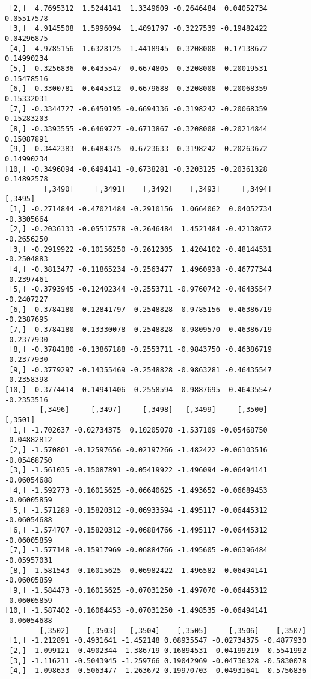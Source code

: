 \documentclass[
  letterpaper,
  DIV=11,
  numbers=noendperiod]{scrreprt}
\begin{document}
\begin{verbatim}
 [2,]  4.7695312  1.5244141  1.3349609 -0.2646484  0.04052734 0.05517578
 [3,]  4.9145508  1.5996094  1.4091797 -0.3227539 -0.19482422 0.04296875
 [4,]  4.9785156  1.6328125  1.4418945 -0.3208008 -0.17138672 0.14990234
 [5,] -0.3256836 -0.6435547 -0.6674805 -0.3208008 -0.20019531 0.15478516
 [6,] -0.3300781 -0.6445312 -0.6679688 -0.3208008 -0.20068359 0.15332031
 [7,] -0.3344727 -0.6450195 -0.6694336 -0.3198242 -0.20068359 0.15283203
 [8,] -0.3393555 -0.6469727 -0.6713867 -0.3208008 -0.20214844 0.15087891
 [9,] -0.3442383 -0.6484375 -0.6723633 -0.3198242 -0.20263672 0.14990234
[10,] -0.3496094 -0.6494141 -0.6738281 -0.3203125 -0.20361328 0.14892578
         [,3490]     [,3491]    [,3492]    [,3493]     [,3494]    [,3495]
 [1,] -0.2714844 -0.47021484 -0.2910156  1.0664062  0.04052734 -0.3305664
 [2,] -0.2036133 -0.05517578 -0.2646484  1.4521484 -0.42138672 -0.2656250
 [3,] -0.2919922 -0.10156250 -0.2612305  1.4204102 -0.48144531 -0.2504883
 [4,] -0.3813477 -0.11865234 -0.2563477  1.4960938 -0.46777344 -0.2397461
 [5,] -0.3793945 -0.12402344 -0.2553711 -0.9760742 -0.46435547 -0.2407227
 [6,] -0.3784180 -0.12841797 -0.2548828 -0.9785156 -0.46386719 -0.2387695
 [7,] -0.3784180 -0.13330078 -0.2548828 -0.9809570 -0.46386719 -0.2377930
 [8,] -0.3784180 -0.13867188 -0.2553711 -0.9843750 -0.46386719 -0.2377930
 [9,] -0.3779297 -0.14355469 -0.2548828 -0.9863281 -0.46435547 -0.2358398
[10,] -0.3774414 -0.14941406 -0.2558594 -0.9887695 -0.46435547 -0.2353516
        [,3496]     [,3497]     [,3498]   [,3499]     [,3500]     [,3501]
 [1,] -1.702637 -0.02734375  0.10205078 -1.537109 -0.05468750 -0.04882812
 [2,] -1.570801 -0.12597656 -0.02197266 -1.482422 -0.06103516 -0.05468750
 [3,] -1.561035 -0.15087891 -0.05419922 -1.496094 -0.06494141 -0.06054688
 [4,] -1.592773 -0.16015625 -0.06640625 -1.493652 -0.06689453 -0.06005859
 [5,] -1.571289 -0.15820312 -0.06933594 -1.495117 -0.06445312 -0.06054688
 [6,] -1.574707 -0.15820312 -0.06884766 -1.495117 -0.06445312 -0.06005859
 [7,] -1.577148 -0.15917969 -0.06884766 -1.495605 -0.06396484 -0.05957031
 [8,] -1.581543 -0.16015625 -0.06982422 -1.496582 -0.06494141 -0.06005859
 [9,] -1.584473 -0.16015625 -0.07031250 -1.497070 -0.06445312 -0.06005859
[10,] -1.587402 -0.16064453 -0.07031250 -1.498535 -0.06494141 -0.06054688
        [,3502]    [,3503]   [,3504]    [,3505]     [,3506]    [,3507]
 [1,] -1.212891 -0.4931641 -1.452148 0.08935547 -0.02734375 -0.4877930
 [2,] -1.099121 -0.4902344 -1.386719 0.16894531 -0.04199219 -0.5541992
 [3,] -1.116211 -0.5043945 -1.259766 0.19042969 -0.04736328 -0.5830078
 [4,] -1.098633 -0.5063477 -1.263672 0.19970703 -0.04931641 -0.5756836

\end{verbatim}
\end{document}
